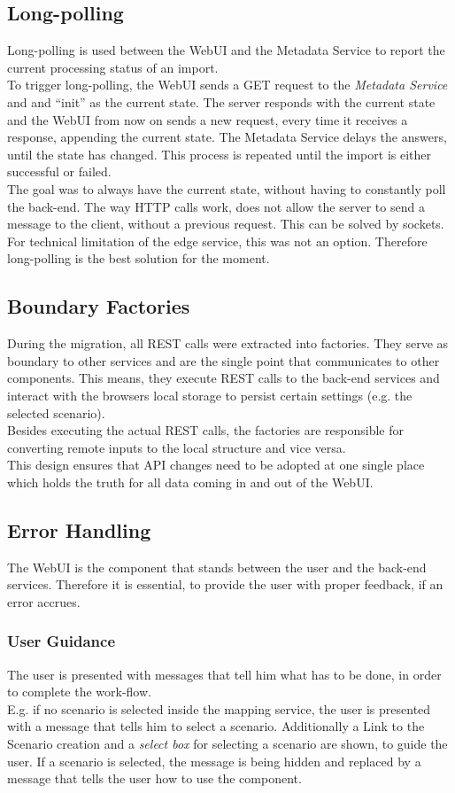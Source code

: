 \subsection{Long-polling}
\label{sec:long-polling}
Long-polling is used between the WebUI and the Metadata Service to report the current processing status of an import.\\
To trigger long-polling, the WebUI sends a GET request to the \textit{Metadata Service} and and \enquote{init} as the current state. The server responds with the current state and the WebUI from now on sends a new request, every time it receives a response, appending the current state. The Metadata Service delays the answers, until the state has changed. This process is repeated until the import is either successful or failed.\\
The goal was to always have the current state, without having to constantly poll the back-end. The way HTTP calls work, does not allow the server to send a message to the client, without a previous request. This can be solved by sockets. For technical limitation of the edge service, this was not an option. Therefore long-polling is the best solution for the moment.

\subsection{Boundary Factories}
During the migration, all REST calls were extracted into factories. They serve as boundary to other services and are the single point that communicates to other components. This means, they execute REST calls to the back-end services and interact with the browsers local storage to persist certain settings (e.g. the selected scenario).\\
Besides executing the actual REST calls, the factories are responsible for converting remote inputs to the local structure and vice versa.\\
This design ensures that API changes need to be adopted at one single place which holds the truth for all data coming in and out of the WebUI.


\subsection{Error Handling}
The WebUI is the component that stands between the user and the back-end services. Therefore it is essential, to provide the user with proper feedback, if an error accrues.

\subsubsection{User Guidance}
The user is presented with messages that tell him what has to be done, in order to complete the work-flow.\\
E.g. if no scenario is selected inside the mapping service, the user is presented with a message that tells him to select a scenario. Additionally a Link to the Scenario creation and a \textit{select box} for selecting a scenario are shown, to guide the user. If a scenario is selected, the message is being hidden and replaced by a message that tells the user how to use the component.

